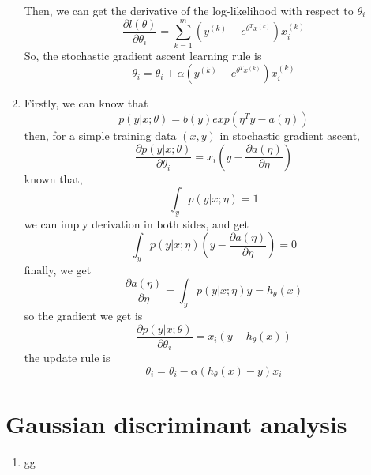 \documentclass[12pt]{article}
\begin{document}
\begin{enumerate}[label=(\alph*)]
    Then, we can get the derivative of the log-likelihood with respect to $\theta_i$
    $$ \frac{\partial l(\theta)}{\partial \theta_i} 
       = \sum_{k=1}^m (y^{(k)}-e^{\theta^Tx^{(k)}})x^{(k)}_i
    $$
    So, the stochastic gradient ascent learning rule is
    $$ \theta_i = \theta_i + \alpha(y^{(k)}-e^{\theta^Tx^{(k)}})x^{(k)}_i
    $$

    \item 
    
    Firstly, we can know that
    $$ p(y|x;\theta) = b(y)exp(\eta^Ty-a(\eta)) $$
    then, for a simple training data $(x,y)$ in stochastic gradient ascent,
    $$ \frac{\partial p(y|x;\theta)}{\partial \theta_i} 
        = x_i(y-\frac{\partial a(\eta)}{\partial \eta})
    $$
    known that,
    $$ \int_{y}p(y|x;\eta) = 1 $$
    we can imply derivation in both sides, and get
    $$ \int_{y}p(y|x;\eta)(y-\frac{\partial a(\eta)}{\partial \eta}) = 0 $$
    finally, we get
    $$ \frac{\partial a(\eta)}{\partial \eta} = \int_{y}p(y|x;\eta)y = h_\theta(x) $$
    so the gradient we get is
    $$ \frac{\partial p(y|x;\theta)}{\partial \theta_i} 
        = x_i(y-h_\theta(x))
    $$
    the update rule is
    $$ \theta_i = \theta_i - \alpha(h_\theta(x)-y)x_i $$
    \end{enumerate}

    

    \newpage
    \section*{Gaussian discriminant analysis   }
    \begin{enumerate}[label=(\alph*)]
    
    \item 

    gg

    \end{enumerate}
\end{document}
